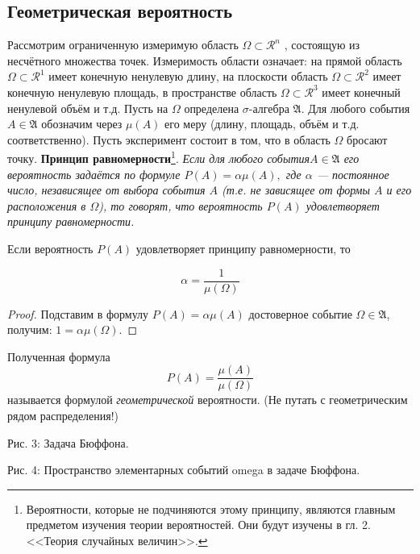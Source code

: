 \subsection{Геометрическая вероятность}

Рассмотрим ограниченную измеримую область $\Omega \subset \mathcal{R}^n$ , состоящую из несчётного множества точек. Измеримость области означает: на прямой область $\Omega \subset \mathcal{R}^1$ имеет конечную ненулевую длину, на плоскости область $\Omega \subset \mathcal{R}^2$ имеет конечную ненулевую площадь, в пространстве область $\Omega \subset \mathcal{R}^3$ имеет конечный ненулевой объём и т.д. Пусть на $\Omega$ определена $\sigma$-алгебра $\mathfrak{A}$. Для любого события $A \in \mathfrak{A}$ обозначим через $\mu(A)$ его меру (длину, площадь, объём и т.д. соответственно). Пусть эксперимент состоит в том, что в область $\Omega$ бросают точку.
\textbf{Принцип равномерности}\footnote{
Вероятности, которые не подчиняются этому принципу, являются главным предметом изучения теории вероятностей. Они будут изучены в гл. 2. <<Теория случайных величин>>.	
}. 
\textit{Если для любого события$A \in \mathfrak{A}$ его вероятность задаётся по формуле
$P(A) = \alpha \mu(A),$
где $\alpha$ — постоянное число, независящее от выбора события $A$ (т.е. не зависящее от формы $A$ и его расположения в $\Omega$), то говорят, что вероятность
$P(A)$ удовлетворяет принципу равномерности.}

\begin{lemma}

 Если вероятность $P(A)$ удовлетворяет принципу равномерности, то

$$\alpha=\frac{1}{\mu(\Omega)}$$
\end{lemma}

\begin{proof}
	Подставим в формулу $P(A) = \alpha \mu(A)$ достоверное событие $\Omega \in \mathfrak{A}$, получим: $1 = \alpha\mu(\Omega).$
\end{proof} 

\begin{definition}
Полученная формула
$$P(A) = \frac{\mu(A)}{\mu(\Omega)}$$
называется формулой \textit{геометрической} вероятности. (Не путать с геометрическим рядом распределения!)
\end{definition}

Рис. 3: Задача Бюффона.

Рис. 4: Пространство элементарных событий omega в задаче Бюффона.


